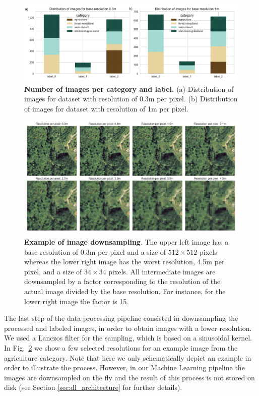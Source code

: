 \begin{figure}[h!]
	\centering
	\captionsetup{width=1\linewidth}
	\includegraphics[width=1\textwidth]{Figures/imstats.pdf}
	\caption{\textbf{Number of images per category and label.} (a) Distribution of images for dataset with resolution of 0.3m per pixel. (b) Distribution of images for dataset with resolution of 1m per pixel.}
	\label{fig:imstats}
\end{figure}

\begin{figure}[h!]
	\centering
	\captionsetup{width=1\linewidth}
	\includegraphics[width=1\textwidth]{Figures/demo_degrade.pdf}
	\caption{\textbf{Example of image downsampling}. The upper left image has a base resolution of 0.3m per pixel and a size of $512\times512$ pixels whereas the lower right image has the worst resolution, 4.5m per pixel, and a size of $34\times34$ pixels. All intermediate images are downsampled by a factor corresponding to the resolution of the actual image divided by the base resolution. For instance, for the lower right image the factor is 15.}
	\label{fig:degrade}
\end{figure}

The last step of the data processing pipeline consisted in downsampling the processed and labeled images, in order to obtain images with a lower resolution. We used a Lanczos filter \parencite{duchon1979} for the sampling, which is based on a sinusoidal kernel. In Fig.~\ref{fig:degrade} we show a few selected resolutions for an example image from the agriculture category. Note that here we only schematically depict an example in order to illustrate the process. However, in our Machine Learning pipeline the images are downsampled on the fly and the result of this process is not stored on disk (see Section \ref{sec:dl_architecture} for further details).

